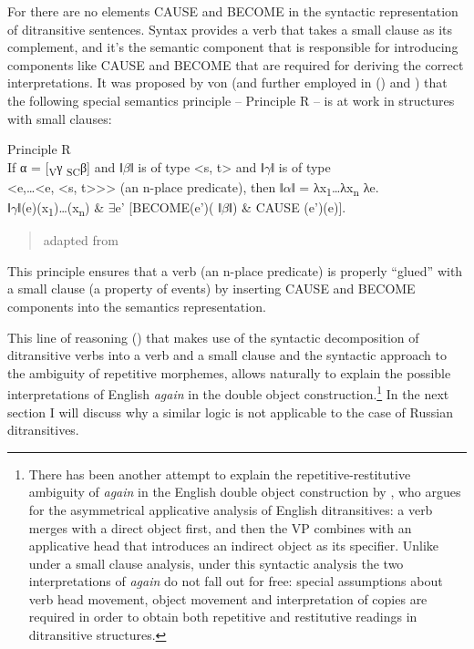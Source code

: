 \documentclass[output=paper,modfonts,nonflat,
 hidelinks
]{langsci/langscibook}
\begin{document}
For \citet{BeckJohnson2004} there are no elements CAUSE and BECOME in the syntactic representation of ditransitive sentences. Syntax provides a verb that takes a small clause as its complement, and it’s the semantic component that is responsible for introducing components like CAUSE and BECOME that are required for deriving the correct interpretations. It was proposed by von \citet{Stechow1995} (and further employed in (\citealt{BeckJohnson2004}) and \citep{Beck2005}) that the following special semantics principle – Principle R – is at work in structures with small clauses:


\ea
Principle R\\

     If α = [\textsubscript{V}γ  \textsubscript{SC}β] and ǁ$\beta ǁ$ is of type <s, t> and ǁ$\gamma ǁ$ is of type\\
     <e,…<e, <s, t>>> (an n-place predicate), then ǁ$\alpha ǁ$ = λx\textsubscript{1}…λx\textsubscript{n} λe.\\
     ǁ$\gamma ǁ$(e)(x\textsubscript{1})…(x\textsubscript{n}) \& ${\exists}$e' [BECOME(e')( ǁ$\beta ǁ$) \& CAUSE (e')(e)].\\
     \z
\begin{quote}
adapted from \citep[7]{Beck2005}
\end{quote}


This principle ensures that a verb (an n-place predicate) is properly “glued” with a small clause (a property of events) by inserting CAUSE and BECOME components into the semantics representation.



This line of reasoning (\citealt{BeckJohnson2004}) that makes use of the syntactic decomposition of ditransitive verbs into a verb and a small clause and the syntactic approach to the ambiguity of repetitive morphemes, allows naturally to explain the possible interpretations of English \textit{again} in the double object construction.\footnote{There has been another attempt to explain the repetitive-restitutive ambiguity of \textit{again} in the English double object construction by \citet{Bruening2010}, who argues for the asymmetrical applicative analysis of English ditransitives: a verb merges with a direct object first, and then the VP combines with an applicative head that introduces an indirect object as its specifier. Unlike under a small clause analysis, under this syntactic analysis the two interpretations of \textit{again} do not fall out for free: special assumptions about verb head movement, object movement and interpretation of copies are required in order to obtain both repetitive and restitutive readings in ditransitive structures.} In the next section I will discuss why a similar logic is not applicable to the case of Russian ditransitives.
\end{document}
